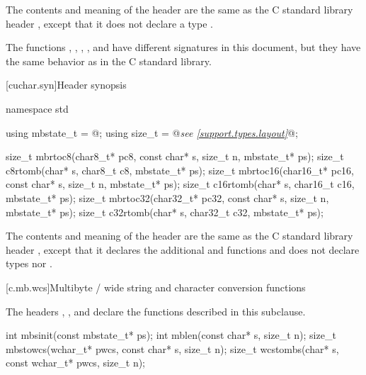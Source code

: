 \pnum
The contents and meaning of the header 
are the same as the C standard library header
, except that it does not declare a type .

\pnum
\begin{note}
The functions
, , , , and 
have different signatures in this document,
but they have the same behavior as in the C standard library.
\end{note}


[cuchar.syn]{Header  synopsis}

%
%
%
%
%
%
%
%
\begin{codeblock}
namespace std {
  using mbstate_t = @\seebelow@;
  using size_t = @\textit{see \ref{support.types.layout}}@;

  size_t mbrtoc8(char8_t* pc8, const char* s, size_t n, mbstate_t* ps);
  size_t c8rtomb(char* s, char8_t c8, mbstate_t* ps);
  size_t mbrtoc16(char16_t* pc16, const char* s, size_t n, mbstate_t* ps);
  size_t c16rtomb(char* s, char16_t c16, mbstate_t* ps);
  size_t mbrtoc32(char32_t* pc32, const char* s, size_t n, mbstate_t* ps);
  size_t c32rtomb(char* s, char32_t c32, mbstate_t* ps);
}
\end{codeblock}

\pnum
The contents and meaning of the header 
are the same as the C standard library header
, except that it
declares the additional  and  functions
and does not declare types  nor .


[c.mb.wcs]{Multibyte / wide string and character conversion functions}

\pnum
\begin{note}
The headers ,
,
and 
declare the functions described in this subclause.
\end{note}

%
%
%
%
\begin{itemdecl}
int mbsinit(const mbstate_t* ps);
int mblen(const char* s, size_t n);
size_t mbstowcs(wchar_t* pwcs, const char* s, size_t n);
size_t wcstombs(char* s, const wchar_t* pwcs, size_t n);
\end{itemdecl}

